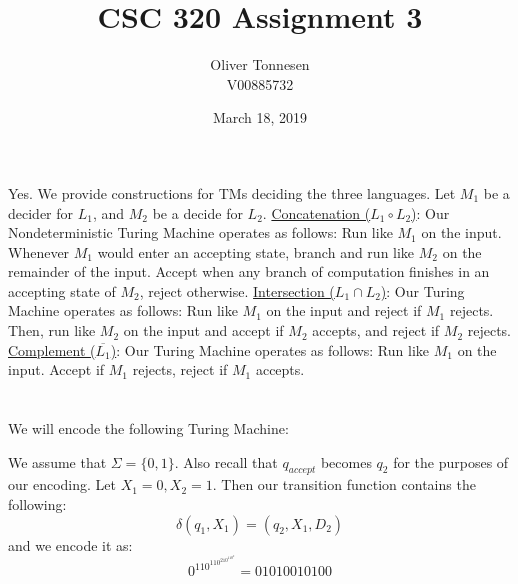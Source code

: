 \documentclass{article}
\title{CSC 320 Assignment 3}
\author{Oliver Tonnesen\\V00885732}
\date{March 18, 2019}
\begin{document}
\maketitle
\renewcommand{\thesubsection}{\thesection.\alph{subsection}}

\section{} %
Yes. We provide constructions for TMs deciding the three languages. Let $M_1$
be a decider for $L_1$, and $M_2$ be a decide for $L_2$.
\newline
\newline
\underline{Concatenation ($L_1\circ L_2$)}: Our Nondeterministic Turing
Machine operates as follows:
\newline
\newline
Run like $M_1$ on the input. Whenever $M_1$ would enter an accepting state,
branch and run like $M_2$ on the remainder of the input. Accept when any branch
of computation finishes in an accepting state of $M_2$, reject otherwise.
\newline
\newline
\underline{Intersection ($L_1\cap L_2$)}: Our Turing Machine operates as
follows:
\newline
\newline
Run like $M_1$ on the input and reject if $M_1$ rejects. Then, run like $M_2$
on the input and accept if $M_2$ accepts, and reject if $M_2$ rejects.
\newline
\newline
\underline{Complement ($\overline{L_1}$)}: Our Turing Machine operates as
follows:
\newline
\newline
Run like $M_1$ on the input. Accept if $M_1$ rejects, reject if $M_1$ accepts.

\section{} %
We will encode the following Turing Machine:
\newline
\newline
\begin{minipage}{\textwidth}

\end{minipage}
\newline
\newline
We assume that $\Sigma=\{0,1\}$. Also recall that $q_{accept}$ becomes $q_2$
for the purposes of our encoding.
\newline
\newline
Let $X_1=0,X_2=1$. Then our transition function contains the following:
\[\delta(q_1,X_1)=(q_2,X_1,D_2)\]
and we encode it as:
\[0^110^110^210^110^2=01010010100\]
\end{document}
